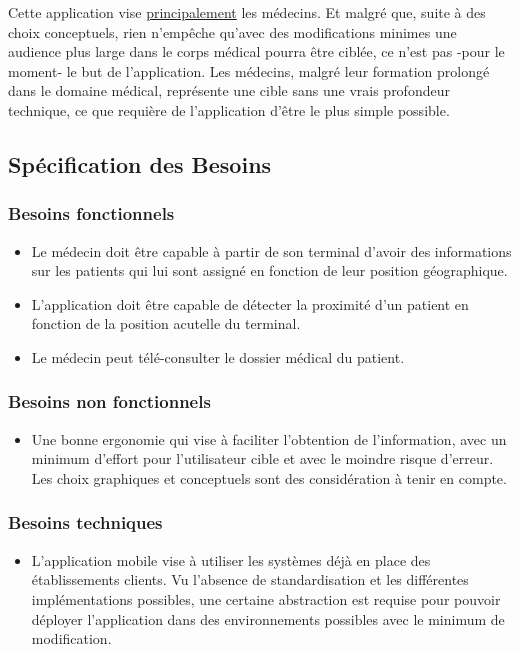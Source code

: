 Cette application vise \underline{principalement} les médecins. Et
malgré que, suite à des choix conceptuels, rien n’empêche qu’avec des
modifications minimes une audience plus large dans le corps médical
pourra être ciblée, ce n’est pas -pour le moment- le but de
l’application. Les médecins, malgré leur formation prolongé dans le
domaine médical, représente une cible sans une vrais profondeur
technique, ce que requière de l’application d’être le plus simple
possible.

\subsection{Spécification des Besoins}
\subsubsection{Besoins fonctionnels}
\begin{itemize}
\item Le médecin doit être capable à partir de son terminal d’avoir des informations sur les patients qui lui sont assigné en fonction de leur position géographique.

\item L'application doit être capable de détecter la proximité d'un
patient en fonction de la position acutelle du terminal.

\item Le médecin peut télé-consulter le dossier médical du patient.


\end{itemize}

\subsubsection{Besoins non fonctionnels}
\begin{itemize}

\item Une bonne ergonomie qui vise à faciliter l'obtention de
l'information, avec un minimum d'effort pour l'utilisateur cible et
avec le moindre risque d'erreur. Les choix graphiques et conceptuels
sont des considération à tenir en compte.

\end{itemize}

\subsubsection{Besoins techniques}
\begin{itemize}

\item L’application mobile vise à utiliser les systèmes déjà en place des établissements clients. Vu l’absence de standardisation et les différentes implémentations possibles, une certaine abstraction est requise pour pouvoir déployer l’application dans des environnements possibles avec le minimum de modification.

\end{itemize}

